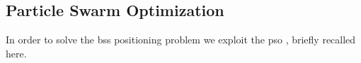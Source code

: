 \documentclass[conference,draftcls,onecolumn]{IEEEtran}
\begin{document}

\subsection{Particle Swarm Optimization}

In order to solve the \acp{bs} positioning problem we exploit the \ac{pso} \cite{Kennedy-11}, briefly recalled here.
 
\end{document}
